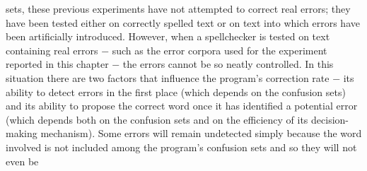 \documentclass[a4paper,english,12pt]{article}
\begin{document}
\begin{spacing}{1.0}
\begin{itemize}
sets, these previous experiments have not attempted to correct real errors; they have been tested
either on correctly spelled text or on text into which errors have been artificially introduced.
However, when a spellchecker is tested on text containing real errors − such as the error corpora
used for the experiment reported in this chapter − the errors cannot be so neatly controlled. In this
situation there are two factors that influence the program's correction rate − its ability to detect
errors in the first place (which depends on the confusion sets) and its ability to propose the correct
word once it has identified a potential error (which depends both on the confusion sets and on the
efficiency of its decision-making mechanism). Some errors will remain undetected simply because
the word involved is not included among the program's confusion sets and so they will not even be
\end{itemize}



\end{spacing}
\end{document}
